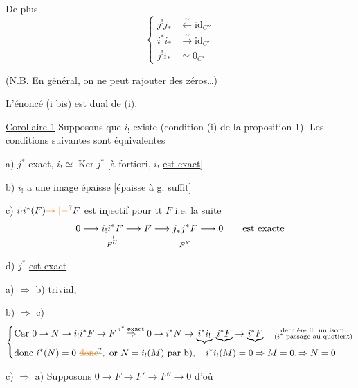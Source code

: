 De plus
\[
\left\{\begin{aligned}
j^!j_*&\xleftarrow{\sim}\mathrm{id}_{C''}\\
i^*i_*&\xrightarrow{\sim}\mathrm{id}_{C'}\\
j^!i_*&\simeq 0_{C'}
\end{aligned}\right.
\]


(N.B. En général, on ne peut rajouter des zéros\ldots)




L'énoncé (i bis) est dual de (i).

\uline{Corollaire 1}  Supposons que $i_!$ existe (condition (i) de la proposition 1). Les conditions suivantes sont équivalentes

a) $j^*$ exact, $i_!\simeq\operatorname{Ker}j^*$ [à fortiori, $i_!$ \uline{est exact}]

b) $i_!$ a une image  épaisse [épaisse à g. suffit]

c) $i_!i^*(F)\unsure{\to|-}F$ est injectif pour tt $F$ i.e. la suite
\[
0\longrightarrow\underset{\substack{\shortparallel\\F^U}}{i_!i^*F}
\longrightarrow F\longrightarrow\underset{\substack{\shortparallel\\F^Y}}{j_*j^*F}
\longrightarrow 0\qquad\text{est exacte}
\]

d) $j^*$ \uline{est exact}


a) $\Rightarrow$ b) trivial,

b) $\Rightarrow$ c)
\[
\left\{\begin{aligned}
&\text{Car }0\to N\to i_!i^*F\to F \overset{i^*\text{ exact}}{\Rightarrow}0\to i^*N\to\underbrace{i^*i_!}\,\underbrace{i^*F}\to\underbrace{i^*F}\quad\substack{\text{dernière fl. un isom.}\\\text{($i^*$ passage au quotient)}}\\
&\text{donc }i^*(N)=0\ \deleted{\unsure{\text{donc}}},\ \text{or } N=i_!(M)\ \text{par b)},\quad i^*i_!(M)=0\Rightarrow M=0,\Rightarrow N=0
\end{aligned}\right.
\]

c) $\Rightarrow$ a)  Supposons \uline{$0\to F\to F'\to F''\to0$} d'où

